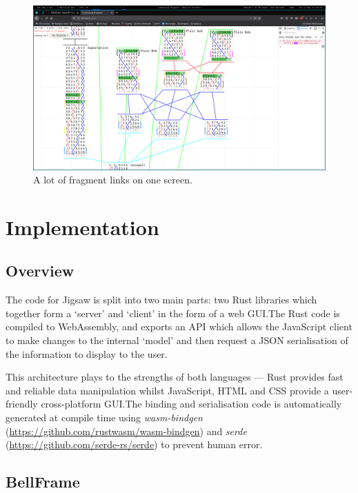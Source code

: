\documentclass[12pt]{article}
\begin{document}
\begin{figure}[h!]
    \centering
    \includegraphics[width=\textwidth]{linking-insane}
    \caption{A lot of fragment links on one screen.}\label{fig:linking-insane}
\end{figure}



\pagebreak

\section{Implementation}

\subsection{Overview}

The code for Jigsaw is split into two main parts: two Rust libraries which together form a `server'
and `client' in the form of a web GUI.\@  The Rust code is compiled to WebAssembly, and exports an
API which allows the JavaScript client to make changes to the internal `model' and then request a
JSON serialisation of the information to display to the user.

This architecture plays to the strengths of both languages --- Rust provides fast and reliable data
manipulation whilst JavaScript, HTML and CSS provide a user-friendly cross-platform GUI.\@  The
binding and serialisation code is automatically generated at compile time using \emph{wasm-bindgen}
(\url{https://github.com/rustwasm/wasm-bindgen}) and \emph{serde}
(\url{https://github.com/serde-rs/serde}) to prevent human error.  

\subsection{BellFrame}
\end{document}
